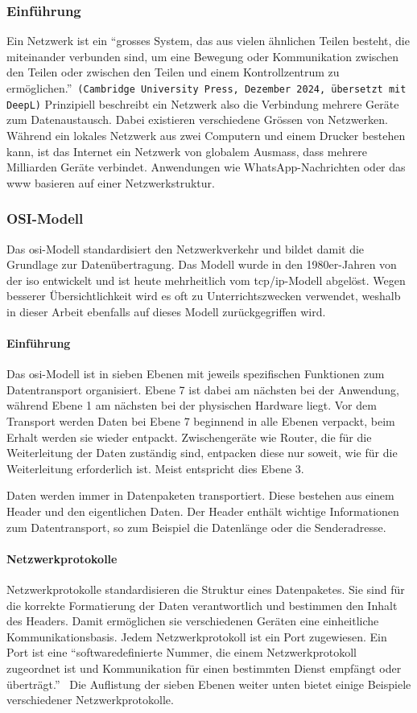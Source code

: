 \documentclass[11pt, a4paper]{article}
\begin{document}
\subsubsection{Einführung}
Ein Netzwerk ist ein ``grosses System, das aus vielen ähnlichen Teilen besteht, die miteinander verbunden sind, um eine Bewegung oder Kommunikation zwischen den Teilen oder zwischen den Teilen und einem Kontrollzentrum zu ermöglichen.''~\texttt{(Cambridge University Press, Dezember 2024, übersetzt mit DeepL)} Prinzipiell beschreibt ein Netzwerk also die Verbindung mehrere Geräte zum Datenaustausch. Dabei existieren verschiedene Grössen von Netzwerken. Während ein lokales Netzwerk aus zwei Computern und einem Drucker bestehen kann, ist das Internet ein Netzwerk von globalem Ausmass, dass mehrere Milliarden Geräte verbindet. Anwendungen wie WhatsApp-Nachrichten oder das \gls{www} basieren auf einer Netzwerkstruktur.

\subsubsection{OSI-Modell}\label{subsubsec:osimodell}
Das \gls{osi}-Modell standardisiert den Netzwerkverkehr und bildet damit die Grundlage zur Datenübertragung. Das Modell wurde in den 1980er-Jahren von der \gls{iso} entwickelt und ist heute mehrheitlich vom \gls{tcp}/\gls{ip}-Modell abgelöst. Wegen besserer Übersichtlichkeit wird es oft zu Unterrichtszwecken verwendet, weshalb in dieser Arbeit ebenfalls auf dieses Modell zurückgegriffen wird.~\cite{OSImodelWikipedia:online}
\paragraph{Einführung}
Das \gls{osi}-Modell ist in sieben Ebenen mit jeweils spezifischen Funktionen zum Datentransport organisiert. Ebene 7 ist dabei am nächsten bei der Anwendung, während Ebene 1 am nächsten bei der physischen Hardware liegt. Vor dem Transport werden Daten bei Ebene 7 beginnend in alle Ebenen verpackt, beim Erhalt werden sie wieder entpackt. Zwischengeräte wie Router, die für die Weiterleitung der Daten zuständig sind, entpacken diese nur soweit, wie für die Weiterleitung erforderlich ist. Meist entspricht dies Ebene 3.

Daten werden immer in Datenpaketen transportiert. Diese bestehen aus einem Header und den eigentlichen Daten. Der Header enthält wichtige Informationen zum Datentransport, so zum Beispiel die Datenlänge oder die Senderadresse. 
\paragraph{Netzwerkprotokolle}
Netzwerkprotokolle standardisieren die Struktur eines Datenpaketes. Sie sind für die korrekte Formatierung der Daten verantwortlich und bestimmen den Inhalt des Headers. Damit ermöglichen sie verschiedenen Geräten eine einheitliche Kommunikationsbasis. Jedem Netzwerkprotokoll ist ein Port zugewiesen. Ein Port ist eine ``softwaredefinierte Nummer, die einem Netzwerkprotokoll zugeordnet ist und Kommunikation für einen bestimmten Dienst empfängt oder überträgt.''~\cite{WasistPo:online} Die Auflistung der sieben Ebenen weiter unten bietet einige Beispiele verschiedener Netzwerkprotokolle.
\end{document}
